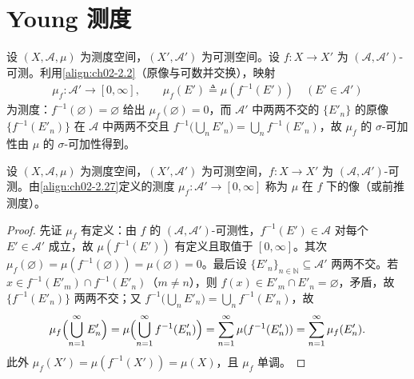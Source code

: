 \documentclass[../../main.tex]{subfiles}%
\begin{document}
\section{Young 测度}\label{section:ch02-Young测度}

设 $(X,\mathscr A,\mu)$ 为测度空间，$(X',\mathscr A')$ 为可测空间。设 $f:X\to X'$ 为 $(\mathscr A,\mathscr A')$-可测。利用\eqref{align:ch02-2.2}（原像与可数并交换），映射
\begin{align}
\mu_f:\mathscr A'\to[0,\infty],\qquad \mu_f(E')\triangleq \mu(f^{-1}(E'))\quad(E'\in\mathscr A') \label{align:ch02-2.27}
\end{align}
为测度：$f^{-1}(\varnothing)=\varnothing$ 给出 $\mu_f(\varnothing)=0$，而 $\mathscr A'$ 中两两不交的 $\{E'_n\}$ 的原像 $\{f^{-1}(E'_n)\}$ 在 $\mathscr A$ 中两两不交且 $f^{-1}\bigl(\bigcup_nE'_n\bigr)=\bigcup_nf^{-1}(E'_n)$，故 $\mu_f$ 的 $\sigma$-可加性由 $\mu$ 的 $\sigma$-可加性得到。

\begin{definition}\label{definition:ch02-像测度}
设 $(X,\mathscr A,\mu)$ 为测度空间，$(X',\mathscr A')$ 为可测空间，$f:X\to X'$ 为 $(\mathscr A,\mathscr A')$-可测。由\eqref{align:ch02-2.27}定义的测度 $\mu_f:\mathscr A'\to[0,\infty]$ 称为 $\mu$ 在 $f$ 下的像（或前推测度）。
\end{definition}

\begin{proof}
先证 $\mu_f$ 有定义：由 $f$ 的 $(\mathscr A,\mathscr A')$-可测性，$f^{-1}(E')\in\mathscr A$ 对每个 $E'\in\mathscr A'$ 成立，故 $\mu(f^{-1}(E'))$ 有定义且取值于 $[0,\infty]$。其次 $\mu_f(\varnothing)=\mu(f^{-1}(\varnothing))=\mu(\varnothing)=0$。最后设 $\{E'_n\}_{n\in\mathbb N}\subseteq\mathscr A'$ 两两不交。若 $x\in f^{-1}(E'_m)\cap f^{-1}(E'_n)$（$m\neq n$），则 $f(x)\in E'_m\cap E'_n=\varnothing$，矛盾，故 $\{f^{-1}(E'_n)\}$ 两两不交；又 $f^{-1}\bigl(\bigcup_nE'_n\bigr)=\bigcup_nf^{-1}(E'_n)$，故
\begin{align*}
\mu_f\Bigl(\bigcup_{n=1}^\infty E'_n\Bigr)
=\mu\Bigl(\bigcup_{n=1}^\infty f^{-1}(E'_n)\Bigr)
=\sum_{n=1}^\infty\mu(f^{-1}(E'_n))
=\sum_{n=1}^\infty\mu_f(E'_n).
\end{align*}
此外 $\mu_f(X')=\mu(f^{-1}(X'))=\mu(X)$，且 $\mu_f$ 单调。
\end{proof}
\end{document}
